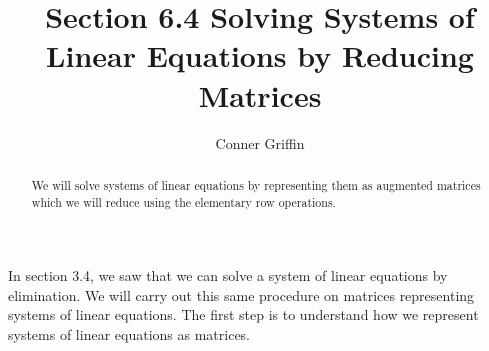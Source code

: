 \documentclass{ximera}
\title{Section 6.4 Solving Systems of Linear Equations by Reducing Matrices}
\author{Conner Griffin}
\begin{document}
\begin{abstract}
    We will solve systems of linear equations by representing them as augmented matrices which we will reduce using the elementary row operations.
\end{abstract}
\maketitle

In section 3.4, we saw that we can solve a system of linear equations by elimination. We will carry out this same procedure on matrices representing systems of linear equations. The first step is to understand how we represent systems of linear equations as matrices.






\end{document}
